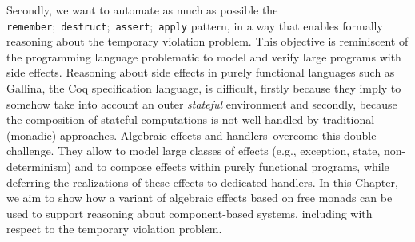 Secondly, we want to automate as much as possible the
\texttt{remember};~\texttt{destruct};~\texttt{assert};~\texttt{apply} pattern,
in a way that enables formally reasoning about the temporary violation problem.
%
This objective is reminiscent of the programming language problematic to model
and verify large programs with side effects.
%
Reasoning about side effects in purely functional languages such as {\textsc
  Gallina}, the Coq specification language, is difficult, firstly because they
imply to somehow take into account an outer \emph{stateful} environment and
secondly, because the composition of stateful computations is not well handled
by traditional (monadic) approaches.
%
Algebraic effects and handlers\,\cite{bauer2015effects} overcome this double
challenge.
%
They allow to model large classes of effects (e.g., exception, state,
non-determinism) and to compose effects within purely functional programs, while
deferring the realizations of these effects to dedicated handlers.
%
In this Chapter, we aim to show how a variant of algebraic effects based on free
monads can be used to support reasoning about component-based systems, including
with respect to the temporary violation problem.

